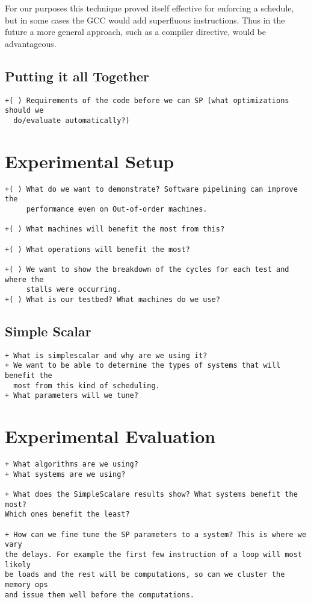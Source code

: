 \documentclass[10pt]{article}
\begin{document}
For our purposes this technique proved itself effective for enforcing a
schedule, but in some cases the GCC would add superfluous instructions. Thus
in the future a more general approach, such as a compiler directive, would be
advantageous.


\subsection{Putting it all Together}
\begin{verbatim}
+( ) Requirements of the code before we can SP (what optimizations should we
  do/evaluate automatically?)

\end{verbatim}

\section{Experimental Setup}
\begin{verbatim}
+( ) What do we want to demonstrate? Software pipelining can improve the
     performance even on Out-of-order machines.

+( ) What machines will benefit the most from this?

+( ) What operations will benefit the most?

+( ) We want to show the breakdown of the cycles for each test and where the
     stalls were occurring.
+( ) What is our testbed? What machines do we use?
\end{verbatim}

\subsection{Simple Scalar}

\begin{verbatim}
+ What is simplescalar and why are we using it?
+ We want to be able to determine the types of systems that will benefit the
  most from this kind of scheduling.
+ What parameters will we tune?
\end{verbatim}

\section{Experimental Evaluation}

\begin{verbatim}
+ What algorithms are we using?
+ What systems are we using?

+ What does the SimpleScalare results show? What systems benefit the most?
Which ones benefit the least?

+ How can we fine tune the SP parameters to a system? This is where we vary
the delays. For example the first few instruction of a loop will most likely
be loads and the rest will be computations, so can we cluster the memory ops
and issue them well before the computations.

\end{verbatim}
\end{document}
